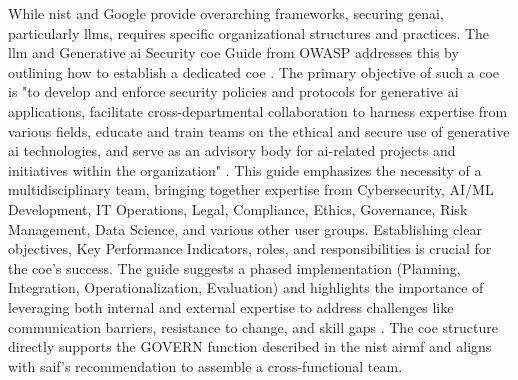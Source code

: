 While \gls{nist} and Google provide overarching frameworks, securing \gls{genai}, particularly \glspl{llm}, requires specific organizational structures and practices. The \gls{llm} and Generative \gls{ai} Security \gls{coe} Guide from OWASP addresses this by outlining how to establish a dedicated \gls{coe} \cite{editor_llm_nodate-1}. The primary objective of such a \gls{coe} is "to develop and enforce security policies and protocols for generative \gls{ai} applications, facilitate cross-departmental collaboration to harness expertise from various fields, educate and train teams on the ethical and secure use of generative \gls{ai} technologies, and serve as an advisory body for \gls{ai}-related projects and initiatives within the organization" \cite[p.4]{editor_llm_nodate-1}. This guide emphasizes the necessity of a multidisciplinary team, bringing together expertise from Cybersecurity, AI/ML Development, IT Operations, Legal, Compliance, Ethics, Governance, Risk Management, Data Science, and various other user groups\cite{editor_llm_nodate-1}. Establishing clear objectives, Key Performance Indicators, roles, and responsibilities is crucial for the \gls{coe}'s success. The guide suggests a phased implementation (Planning, Integration, Operationalization, Evaluation) and highlights the importance of leveraging both internal and external expertise to address challenges like communication barriers, resistance to change, and skill gaps \cite{editor_llm_nodate-1}. The \gls{coe} structure directly supports the GOVERN function described in the \gls{nist} \gls{airmf} and aligns with \gls{saif}'s recommendation to assemble a cross-functional team.

